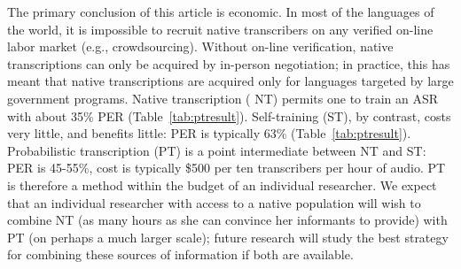 {\color{blue} The primary conclusion of this article is economic.  In
  most of the languages of the world, it is impossible to recruit
  native transcribers on any verified on-line labor market (e.g.,
  crowdsourcing).  Without on-line verification, native transcriptions
  can only be acquired by in-person negotiation; in practice, this has
  meant that native transcriptions are acquired only for languages
  targeted by large government programs.  Native transcription ({\sc
    NT}) permits one to train an ASR with about 35\% PER
  (Table~\ref{tab:ptresult}).  Self-training ({\sc ST}), by contrast,
  costs very little, and benefits little: PER is typically 63\%
  (Table~\ref{tab:ptresult}).  Probabilistic transcription ({\sc PT})
  is a point intermediate between {\sc NT} and {\sc ST}: PER is
  45-55\%, cost is typically \$500 per ten transcribers per hour of
  audio. {\sc PT} is therefore a method within the budget of an
  individual researcher.  We expect that an individual researcher with
  access to a native population will wish to combine {\sc NT} (as many
  hours as she can convince her informants to provide) with {\sc PT}
  (on perhaps a much larger scale); future research will study the
  best strategy for combining these sources of information if both are
  available.}


